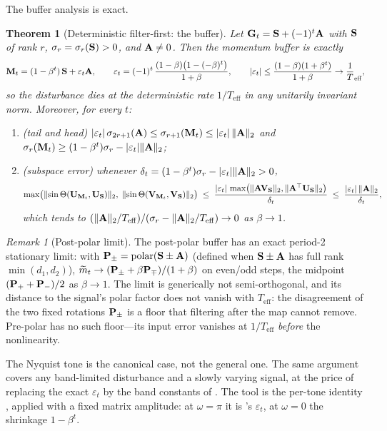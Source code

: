 \documentclass[11pt,a4paper]{article}
\newtheorem{theorem}{Theorem}
\theoremstyle{remark}
\newtheorem{remark}{Remark}
\newcommand{\Teff}{T_{\mathrm{eff}}}
\DeclareMathOperator{\polar}{polar}
\begin{document}
The buffer analysis is exact.

\begin{theorem}[Deterministic filter-first: the buffer]
\label{thm:filterfirst}
Let $\mathbf{G}_t=\mathbf{S}+(-1)^t\mathbf{A}$ with $\mathbf{S}$ of rank $r$, $\sigma_r=\sigma_r(\mathbf{S})>0$, and $\mathbf{A}\ne0$.
Then the momentum buffer is exactly
\[
\Mbf_t=(1-\beta^t)\,\Sbf+\varepsilon_t \Abf,\qquad
\varepsilon_t=(-1)^t\,\frac{(1-\beta)\bigl(1-(-\beta)^t\bigr)}{1+\beta},\qquad
\lvert\varepsilon_t\rvert\le\frac{(1-\beta)(1+\beta^t)}{1+\beta}\to\frac1\Teff,
\]
so the disturbance dies at the deterministic rate $1/\Teff$ in any unitarily invariant norm.
Moreover, for every $t$:
\begin{enumerate}
\item[(a)] (tail and head) $\lvert\varepsilon_t\rvert\,\sigma_{2r+1}(\mathbf{A})\le\sigma_{r+1}(\mathbf{M}_t)\le\lvert\varepsilon_t\rvert\,\lVert\mathbf{A}\rVert_2$ and $\sigma_r(\mathbf{M}_t)\ge(1-\beta^t)\sigma_r-\lvert\varepsilon_t\rvert\lVert\mathbf{A}\rVert_2$;
\item[(b)] (subspace error) whenever $\delta_t=(1-\beta^t)\sigma_r-\lvert\varepsilon_t\rvert\lVert\mathbf{A}\rVert_2>0$,
  \[
  \max\bigl(\lVert\sin\Theta(\mathbf{U}_{\mathbf{M}_t},\mathbf{U}_{\mathbf{S}})\rVert_2,\;\lVert\sin\Theta(\mathbf{V}_{\mathbf{M}_t},\mathbf{V}_{\mathbf{S}})\rVert_2\bigr)
  \;\le\;\frac{\lvert\varepsilon_t\rvert\,\max\bigl(\lVert\mathbf{A}\mathbf{V}_{\mathbf{S}}\rVert_2,\lVert\mathbf{A}^\top\mathbf{U}_{\mathbf{S}}\rVert_2\bigr)}{\delta_t}
  \;\le\;\frac{\lvert\varepsilon_t\rvert\,\lVert\mathbf{A}\rVert_2}{\delta_t},
  \]
which tends to $(\lVert\Abf\rVert_2/\Teff)/(\sigma_r-\lVert\Abf\rVert_2/\Teff)\to0$ as $\beta\to1$.
\end{enumerate}
\end{theorem}

\begin{remark}[Post-polar limit]
\label{rem:postpolar}
The post-polar buffer has an exact period-2 stationary limit: with $\Pbf_\pm=\polar(\Sbf\pm\Abf)$ (defined when $\mathbf{S}\pm\mathbf{A}$ has full rank $\min(d_1,d_2)$), $\widetilde m_t\to(\mathbf{P}_\pm+\beta \mathbf{P}_\mp)/(1+\beta)$ on even/odd steps, the midpoint $(\mathbf{P}_++\mathbf{P}_-)/2$ as $\beta\to1$.
The limit is generically not semi-orthogonal, and its distance to the signal's polar factor does not vanish with $\Teff$: the disagreement of the two fixed rotations $\mathbf{P}_\pm$ is a floor that filtering after the map cannot remove.
Pre-polar has no such floor---its input error vanishes at $1/\Teff$ \emph{before} the nonlinearity.
\end{remark}

The Nyquist tone is the canonical case, not the general one.
The same argument covers any band-limited disturbance and a slowly varying signal, at the price of replacing the exact $\varepsilon_t$ by the band constants of .
The tool is the per-tone identity , applied with a fixed matrix amplitude: at $\omega=\pi$ it is 's $\varepsilon_t$, at $\omega=0$ the shrinkage $1-\beta^t$.
\end{document}
